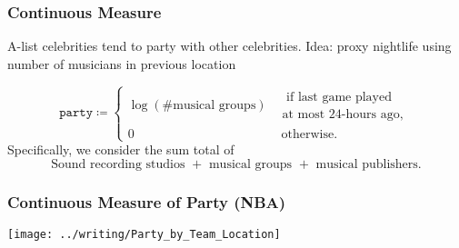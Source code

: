 \documentclass{beamer}
\begin{document}
\begin{frame}   \frametitle{Continuous Measure}
  \begin{block}{A-list celebrities tend to party with other celebrities.}     Idea: proxy nightlife using number of musicians in previous location

    \[
      \texttt{party} \coloneqq \begin{cases}       \log \left(\# \textrm{musical groups}\right) &\substack{\textrm{ if last game played} \\ \textrm{at most 24-hours ago,}} \\
      0 &\textrm{ otherwise.}
    \end{cases}
    \]
    \newline
    Specifically, we consider the sum total of
    \[
      \textrm{Sound recording studios } + \textrm{ musical groups } + \textrm{ musical publishers}.
    \]   \end{block} \end{frame}

\begin{frame}   
  \frametitle{Continuous Measure of Party (NBA)}
  \centering \texttt{[image: ../writing/Party\_by\_Team\_Location]} 
\end{frame}
\end{document}
